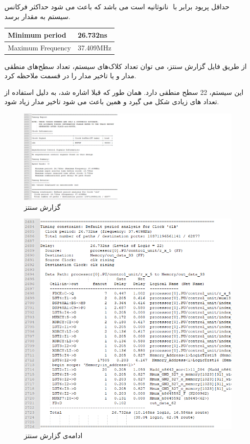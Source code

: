 \documentclass[12pt,onecolumn,a4paper,fleqn]{article}
\begin{document}
حداقل پریود برابر با ‌ نانوثانیه است می باشد که باعث می شود حداکثر فرکانس سیستم به مقدار 
برسد.\\

\begin{latin}
\begin{table}[h]
	\centering
	\begin{tabular}{|l|l|}
		\hline
		Minimum period    & 26.732ns  \\ \hline
		Maximum Frequency & 37.409MHz \\ \hline
	\end{tabular}
\end{table}
\end{latin}

از طریق فایل گزارش سنتز، می توان تعداد کلاک‌های سیستم، تعداد سطح‌های منطقی مدار و  یا تاخیر مدار را در قسمت  ملاحظه کرد.

این سیستم، 22 سطح منطقی دارد. همان طور که قبلا اشاره شد، به دلیل استفاده از  تعداد  های زیادی شکل می گیرد و همین باعث می شود تاخیر مدار زیاد شود.


\begin{figure}[h]
	\centering
	\includegraphics[trim={0 0 20cm 0}, clip, width=0.95\linewidth]{source/4.png}
	\caption{گزارش سنتز}
\end{figure}

\pagebreak

\begin{figure}[h]
	\centering
	\includegraphics[trim={0 0 0 0}, clip, width=0.95\linewidth]{source/5.png}
	\caption{ادامه‌ی گزارش سنتز}
\end{figure}
\end{document}
